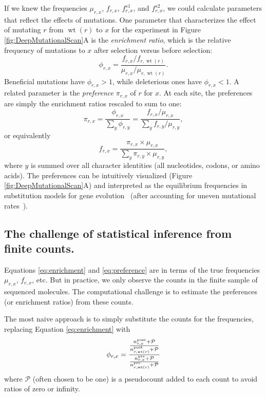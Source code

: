 \documentclass[twocolumn]{bmcart}%
\begin{document}
If we knew the frequencies $\mu_{r,x}$, $f_{r,x}$, $f_{r,x}^{s1}$, and $f_{r,x}^{s2}$, we could calculate parameters that reflect the effects of mutations. One parameter that characterizes the effect of mutating $r$ from $\operatorname{wt}\left(r\right)$ to $x$ for the experiment in Figure \ref{fig:DeepMutationalScan}A is the \emph{enrichment ratio}, which is the relative frequency of mutations to $x$ after selection versus before selection:
\begin{equation}
\label{eq:enrichment}
\phi_{r,x} = \frac{f_{r,x} / f_{r,\operatorname{wt}\left(r\right)}}{\mu_{r,x} / \mu_{r,\operatorname{wt}\left(r\right)}}.
\end{equation}
Beneficial mutations have $\phi_{r,x} > 1$, while deleterious ones have $\phi_{r,x} < 1$. A related parameter is the \emph{preference} $\pi_{r,x}$ of $r$ for $x$. At each site, the preferences are simply the enrichment ratios rescaled to sum to one:
\begin{equation}
\label{eq:preference}
\pi_{r,x} = \frac{\phi_{r,x}}{\sum_y \phi_{r,y}} = \frac{f_{r,x} / \mu_{r,x}}{\sum_y f_{r,y} / \mu_{r,y}},
\end{equation}
or equivalently
\begin{equation}
\label{eq:preference2}
f_{r,x} = \frac{\pi_{r,x} \times \mu_{r,x}}{\sum_y \pi_{r,y} \times \mu_{r,y}},
\end{equation}
where $y$ is summed over all character identities (all nucleotides, codons, or amino acids).
The preferences can be intuitively visualized (Figure \ref{fig:DeepMutationalScan}A) and interpreted as the equilibrium frequencies in substitution models for gene evolution~\cite{bloom2014experimentally,bloom2014informed} (after accounting for uneven mutational rates~\cite{yampolsky2005exchangeability,stoltzfus2009climbing}). 

\subsection*{The challenge of statistical inference from finite counts.}
Equations \ref{eq:enrichment} and \ref{eq:preference} are in terms of the true frequencies $\mu_{r,x}$, $f_{r,x}$, etc. But in practice, we only observe the counts in the finite sample of sequenced molecules. The computational challenge is to estimate the preferences (or enrichment ratios) from these counts.

The most naive approach is to simply substitute the counts for the frequencies, replacing Equation \ref{eq:enrichment} with
\begin{equation}
\label{eq:enrichmentcounts}
\phi_{r,x} = \frac{\frac{n_{r,x}^{\rm{post}} + \mathcal{P}}{n_{r,\operatorname{wt}\left(r\right)}^{\rm{post}} + \mathcal{P}}}{\frac{n_{r,x}^{\rm{pre}} + \mathcal{P}}{n_{r,\operatorname{wt}\left(r\right)}^{\rm{pre}} + \mathcal{P}}}
\end{equation}
where $\mathcal{P}$ (often chosen to be one) is a pseudocount added to each count to avoid ratios of zero or infinity.
\end{document}
